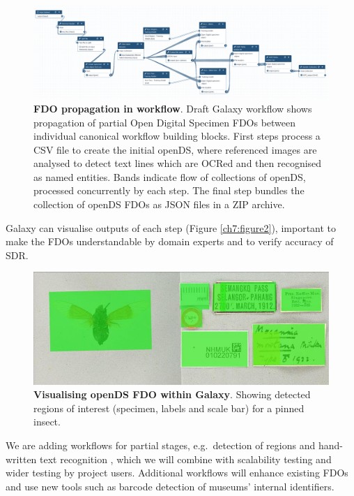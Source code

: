 \begin{figure}%
    \includegraphics[width=\textwidth]{figures/ch07/figure1.png}
	\caption[FDO propagation in workflow]{\textbf{FDO propagation in workflow}. 
    Draft Galaxy workflow \cite{Brack 2022b} 
    shows propagation of partial Open Digital Specimen FDOs between
    individual canonical workflow building blocks. First steps process a \acrshort{CSV}
    file to create the initial openDS, where referenced images are analysed
    to detect text lines which are \acrshort{OCR}ed and then recognised as named
    entities. Bands indicate flow of collections of openDS, processed
    concurrently by each step. The final step bundles the collection of
    openDS FDOs as JSON files in a \gls{ZIP} archive.}
    \label{ch7:figure1}
  \end{figure}

Galaxy can visualise outputs of each step
(Figure \vref{ch7:figure2}), important to make the
FDOs understandable by domain experts and to verify accuracy of SDR.

\begin{figure}%
    \includegraphics[width=\textwidth]{figures/ch07/figure2.jpg}
	\caption[Visualising openDS FDO within Galaxy]{\textbf{Visualising openDS FDO within Galaxy}.
    Showing detected regions of interest
    (specimen, labels and scale bar) for a pinned insect.}
    \label{ch7:figure2}
\end{figure}

We are adding workflows for partial stages, e.g.~detection of regions
\cite{Livermore 2022a} and hand-written text recognition
\cite{Livermore 2022b}, which we will combine with scalability testing and wider
testing by project users. Additional workflows will enhance existing
FDOs and use new tools such as barcode detection of museums' internal
identifiers.


